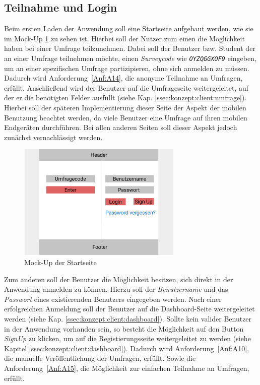\subsection{Teilnahme und Login}

Beim ersten Laden der Anwendung soll eine Startseite aufgebaut werden, wie sie im Mock-Up \ref{fig:MockSignin} zu sehen ist.
Hierbei soll der Nutzer zum einen die Möglichkeit haben bei einer Umfrage teilzunehmen.
Dabei soll der Benutzer bzw. Student der an einer Umfrage teilnehmen möchte, einen \emph{Surveycode} wie \zb \emph{\texttt{OYZQGGXOF9}} eingeben, um an einer spezifischen Umfrage partizipieren, ohne sich anmelden zu müssen.
Dadurch wird Anforderung~\ref{Anf:A14}, die anonyme Teilnahme an Umfragen, erfüllt.
Anschließend wird der Benutzer auf die Umfrageseite weitergeleitet, auf der er die benötigten Felder ausfüllt (siehe Kap. \ref{ssec:konzept:client:umfrage}).
Hierbei soll der späteren Implementierung dieser Seite der Aspekt der mobilen Benutzung beachtet werden, da viele Benutzer eine Umfrage auf ihren mobilen Endgeräten durchführen.
Bei allen anderen Seiten soll dieser Aspekt jedoch zunächst vernachlässigt werden.

\begin{figure}[H]
	\centering
	\includegraphics[width=0.7\textwidth]{img/konzeption/client/signin}
	\captionsetup{justification=centering, format=plain}
	\caption[Mock-Up der Startseite]{Mock-Up der Startseite \\\figma}
	\label{fig:MockSignin}
\end{figure}

Zum anderen soll der Benutzer die Möglichkeit besitzen, sich direkt in der Anwendung anmelden zu können.
Hierzu soll der \emph{Benutzername} und das \emph{Passwort} eines existierenden Benutzers eingegeben werden.
Nach einer erfolgreichen Anmeldung soll der Benutzer auf die Dashboard-Seite weitergeleitet werden (siehe Kap. \ref{ssec:konzept:client:dashboard}).
Sollte kein valider Benutzer in der Anwendung vorhanden sein, so besteht die Möglichkeit auf den Button \emph{SignUp} zu klicken, um auf die Registierungsseite weitergeleitet zu werden (siehe Kapitel \ref{ssec:konzept:client:dashboard}).
Dadurch wird Anforderung~\ref{Anf:A10}, die manuelle Veröffentlichung der Umfragen, erfüllt. 
Sowie die Anforderung~\ref{Anf:A15}, die Möglichkeit zur einfachen Teilnahme an Umfragen, erfüllt.

